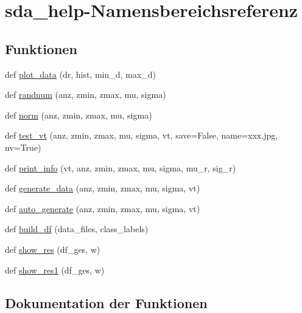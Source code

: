 \hypertarget{namespacesda__help}{}\section{sda\+\_\+help-\/\+Namensbereichsreferenz}
\label{namespacesda__help}
\subsection*{Funktionen}
\begin{DoxyCompactItemize}
\item 
def \mbox{\hyperlink{namespacesda__help_aa4f0c4955e359bd07e5b6846f1edfc7e}{plot\+\_\+data}} (dr, hist, min\+\_\+d, max\+\_\+d)
\item 
def \mbox{\hyperlink{namespacesda__help_abf8f9f4f5d524da32e1379331edaf208}{randnum}} (anz, zmin, zmax, mu, sigma)
\item 
def \mbox{\hyperlink{namespacesda__help_a9fe933819134c7074756554aa536bf5a}{norm}} (anz, zmin, zmax, mu, sigma)
\item 
def \mbox{\hyperlink{namespacesda__help_a474de660167669e393d497758d0f6bfa}{test\+\_\+vt}} (anz, zmin, zmax, mu, sigma, vt, save=False, name=\textquotesingle{}xxx.\+jpg\textquotesingle{}, nv=True)
\item 
def \mbox{\hyperlink{namespacesda__help_a22c6c611e5f3067e66857ed22325e6fd}{print\+\_\+info}} (vt, anz, zmin, zmax, mu, sigma, mu\+\_\+r, sig\+\_\+r)
\item 
def \mbox{\hyperlink{namespacesda__help_a0fd7c56bbe7922702e48e68e8940d875}{generate\+\_\+data}} (anz, zmin, zmax, mu, sigma, vt)
\item 
def \mbox{\hyperlink{namespacesda__help_a6cb08a2ba81e7a050196a6b43e032e17}{auto\+\_\+generate}} (anz, zmin, zmax, mu, sigma, vt)
\item 
def \mbox{\hyperlink{namespacesda__help_a0e84ec3ca4b84fa2226cdc2b9453904f}{build\+\_\+df}} (data\+\_\+files, class\+\_\+labels)
\item 
def \mbox{\hyperlink{namespacesda__help_a74d41be925e950eda99464e5dd3d7428}{show\+\_\+res}} (df\+\_\+ges, w)
\item 
def \mbox{\hyperlink{namespacesda__help_a1bc0f27de2fc69f1624a834c1aec98bb}{show\+\_\+res1}} (df\+\_\+ges, w)
\end{DoxyCompactItemize}


\subsection{Dokumentation der Funktionen}
\mbox{\label{namespacesda__help_a6cb08a2ba81e7a050196a6b43e032e17}} 
